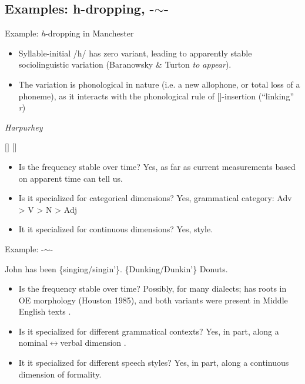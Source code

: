 \documentclass[hyperref={pdfpagelabels=false}]{beamer}
\begin{document}
\subsection{Examples: h-dropping, -$\sim$-}
\begin{frame}{Example: \textsl{h}-dropping in Manchester}
	\begin{itemize}
		\item Syllable-initial /h/ has zero variant, leading to apparently stable sociolinguistic variation (Baranowsky \& Turton \textsl{to appear}).
		\item The variation is phonological in nature (i.e. a new allophone, or total loss of a phoneme), as it interacts with the phonological rule of []-insertion (``linking'' \textsl{r})
	\end{itemize}


	\begin{exe}
		\ex \quad \textsl{Harpurhey}
		\begin{xlist}
			\ex $[$$]$
			\ex $[$$]$
		\end{xlist}
	\end{exe}

	\begin{itemize}
		\item Is the frequency stable over time? Yes, as far as current measurements based on apparent time can tell us.
		\item Is it specialized for categorical dimensions? Yes, grammatical category: Adv > V > N > Adj 
		\item It it specialized for continuous dimensions? Yes, style.
	\end{itemize}


\end{frame}

\begin{frame}{Example: -$\sim$-}
	\begin{exe}
			\ex John has been \{singing/singin'\}.
			\ex \{Dunking/Dunkin'\} Donuts.
	\end{exe}
	\begin{itemize}
		\item Is the frequency stable over time? Possibly, for many dialects; has roots in OE morphology (Houston 1985), and both variants were present in Middle English texts \citep{labov1989}.
		\item Is it specialized for different grammatical contexts? Yes, in part, along a nominal$\leftrightarrow$verbal dimension \citep{labov1989}.
		\item It it specialized for different speech styles? Yes, in part, along a continuous dimension of formality.
	\end{itemize}


\end{frame}
\end{document}
